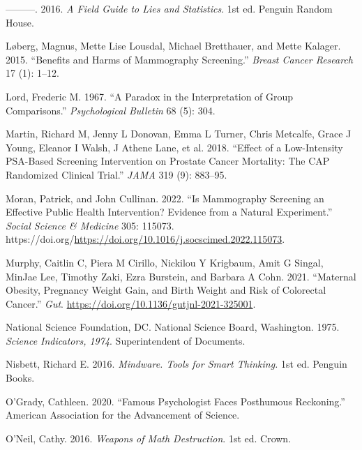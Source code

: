 \documentclass[
  10pt,
  b5paper]{book}
\newlength{\cslhangindent}
\newlength{\cslentryspacingunit} %
\newenvironment{CSLReferences}[2] %
 {%
  \setlength{\parindent}{0pt}
  \ifodd #1
  \let\oldpar\par
  \def\par{\hangindent=\cslhangindent\oldpar}
  \fi
  \setlength{\parskip}{#2\cslentryspacingunit}
 }%
 {}
\begin{document}
\begin{CSLReferences}{1}{0}
\leavevmode{}%
---------. 2016. \emph{A Field Guide to Lies and Statistics}. 1st ed. Penguin Random House.

\leavevmode{}%
Løberg, Magnus, Mette Lise Lousdal, Michael Bretthauer, and Mette Kalager. 2015. {``Benefits and Harms of Mammography Screening.''} \emph{Breast Cancer Research} 17 (1): 1--12.

\leavevmode{}%
Lord, Frederic M. 1967. {``A Paradox in the Interpretation of Group Comparisons.''} \emph{Psychological Bulletin} 68 (5): 304.

\leavevmode{}%
Martin, Richard M, Jenny L Donovan, Emma L Turner, Chris Metcalfe, Grace J Young, Eleanor I Walsh, J Athene Lane, et al. 2018. {``Effect of a Low-Intensity PSA-Based Screening Intervention on Prostate Cancer Mortality: The CAP Randomized Clinical Trial.''} \emph{JAMA} 319 (9): 883--95.

\leavevmode{}%
Moran, Patrick, and John Cullinan. 2022. {``Is Mammography Screening an Effective Public Health Intervention? Evidence from a Natural Experiment.''} \emph{Social Science \& Medicine} 305: 115073. https://doi.org/\url{https://doi.org/10.1016/j.socscimed.2022.115073}.

\leavevmode{}%
Murphy, Caitlin C, Piera M Cirillo, Nickilou Y Krigbaum, Amit G Singal, MinJae Lee, Timothy Zaki, Ezra Burstein, and Barbara A Cohn. 2021. {``Maternal Obesity, Pregnancy Weight Gain, and Birth Weight and Risk of Colorectal Cancer.''} \emph{Gut}. \url{https://doi.org/10.1136/gutjnl-2021-325001}.

\leavevmode{}%
National Science Foundation, DC. National Science Board, Washington. 1975. \emph{Science Indicators, 1974}. Superintendent of Documents.

\leavevmode{}%
Nisbett, Richard E. 2016. \emph{Mindware. Tools for Smart Thinking.} 1st ed. Penguin Books.

\leavevmode{}%
O'Grady, Cathleen. 2020. {``Famous Psychologist Faces Posthumous Reckoning.''} American Association for the Advancement of Science.

\leavevmode{}%
O'Neil, Cathy. 2016. \emph{Weapons of Math Destruction}. 1st ed. Crown.


\end{CSLReferences}
\end{document}
